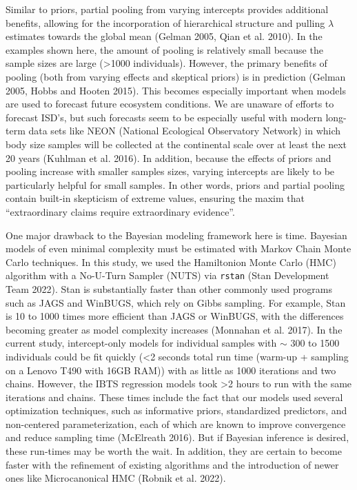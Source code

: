 \documentclass[
  12pt,
]{article}
\numberwithin{equation}
\begin{document}
Similar to priors, partial pooling from varying intercepts provides
additional benefits, allowing for the incorporation of hierarchical
structure and pulling \(\lambda\) estimates towards the global mean
(Gelman 2005, Qian et al. 2010). In the examples shown here, the amount
of pooling is relatively small because the sample sizes are large
(\textgreater1000 individuals). However, the primary benefits of pooling
(both from varying effects and skeptical priors) is in prediction
(Gelman 2005, Hobbs and Hooten 2015). This becomes especially important
when models are used to forecast future ecosystem conditions. We are
unaware of efforts to forecast ISD's, but such forecasts seem to be
especially useful with modern long-term data sets like NEON (National
Ecological Observatory Network) in which body size samples will be
collected at the continental scale over at least the next 20 years
(Kuhlman et al. 2016). In addition, because the effects of priors and
pooling increase with smaller samples sizes, varying intercepts are
likely to be particularly helpful for small samples. In other words,
priors and partial pooling contain built-in skepticism of extreme
values, ensuring the maxim that ``extraordinary claims require
extraordinary evidence''.

One major drawback to the Bayesian modeling framework here is time.
Bayesian models of even minimal complexity must be estimated with Markov
Chain Monte Carlo techniques. In this study, we used the Hamiltonion
Monte Carlo (HMC) algorithm with a No-U-Turn Sampler (NUTS) via
\texttt{rstan} (Stan Development Team 2022). Stan is substantially
faster than other commonly used programs such as JAGS and WinBUGS, which
rely on Gibbs sampling. For example, Stan is 10 to 1000 times more
efficient than JAGS or WinBUGS, with the differences becoming greater as
model complexity increases (Monnahan et al. 2017). In the current study,
intercept-only models for individual samples with \(\sim\) 300 to 1500
individuals could be fit quickly (\textless2 seconds total run time
(warm-up + sampling on a Lenovo T490 with 16GB RAM)) with as little as
1000 iterations and two chains. However, the IBTS regression models took
\textgreater2 hours to run with the same iterations and chains. These
times include the fact that our models used several optimization
techniques, such as informative priors, standardized predictors, and
non-centered parameterization, each of which are known to improve
convergence and reduce sampling time (McElreath 2016). But if Bayesian
inference is desired, these run-times may be worth the wait. In
addition, they are certain to become faster with the refinement of
existing algorithms and the introduction of newer ones like
Microcanonical HMC (Robnik et al. 2022).
\end{document}
